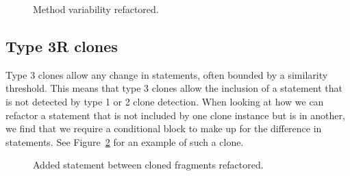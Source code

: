 \begin{figure}[H]
\begin{parcolumns}{2}
\end{parcolumns}
\caption{Method variability refactored.}
\label{fig:type2method}
\end{figure}

\subsection{Type 3R clones}\label{sec:type3r}
Type 3 clones allow any change in statements, often bounded by a similarity threshold. This means that type 3 clones allow the inclusion of a statement that is not detected by type 1 or 2 clone detection. When looking at how we can refactor a statement that is not included by one clone instance but is in another, we find that we require a conditional block to make up for the difference in statements. See Figure~\ref{fig:type3} for an example of such a clone.

\begin{figure}[H]
\begin{parcolumns}{2}
\end{parcolumns}
\caption{Added statement between cloned fragments refactored.}
\label{fig:type3}
\end{figure}

